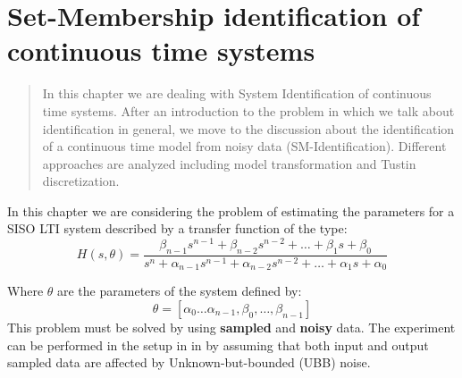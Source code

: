 \chapter{Set-Membership identification of continuous time systems}

\begin{quotation}
    \noindent
    \textsf{In this chapter we are dealing with System Identification of continuous time systems. After an introduction to the problem in which we talk about identification in general, we move to the discussion about the identification of a continuous time model from noisy data (SM-Identification). Different approaches are analyzed including model transformation and Tustin discretization.}
\end{quotation}

\noindent
In this chapter we are considering the problem of estimating the parameters for a SISO LTI system described by a transfer function of the type:
\begin{equation}\label{eq:ct_model}
    H(s,\theta)=\frac{
        \beta_{n-1}{s^{n-1}}+\beta_{n-2}s^{n-2}+\dots+\beta_1{s}+\beta_0
    }{
        s^n+\alpha_{n-1}s^{n-1}+\alpha_{n-2}s^{n-2}+\dots+\alpha_1{s}+\alpha_0
    }
\end{equation}

\noindent
Where $\theta$ are the parameters of the system defined by:
\begin{equation}
    \theta=[\alpha_0\dots\alpha_{n-1},\beta_0,\dots,\beta_{n-1}]
\end{equation}
This problem must be solved by using \textbf{sampled} and \textbf{noisy} data. The experiment can be performed in the setup in  in  by assuming that both input and output sampled data are affected by Unknown-but-bounded (UBB) noise.


